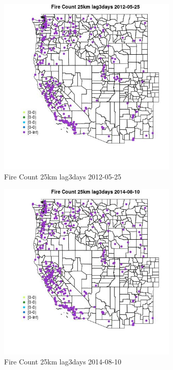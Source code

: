 \begin{figure} 
\centering  
\includegraphics[width=0.77\textwidth]{Code_Outputs/Report_ML_input_PM25_Step4_part_e_de_duplicated_aves_compiled_2019-05-18wNAs_MapObsFire_Count_25km_lag3days2012-05-25.jpg} 
\caption{\label{fig:Report_ML_input_PM25_Step4_part_e_de_duplicated_aves_compiled_2019-05-18wNAsMapObsFire_Count_25km_lag3days2012-05-25}Fire Count 25km lag3days 2012-05-25} 
\end{figure} 
 

\clearpage 

\begin{figure} 
\centering  
\includegraphics[width=0.77\textwidth]{Code_Outputs/Report_ML_input_PM25_Step4_part_e_de_duplicated_aves_compiled_2019-05-18wNAs_MapObsFire_Count_25km_lag3days2014-08-10.jpg} 
\caption{\label{fig:Report_ML_input_PM25_Step4_part_e_de_duplicated_aves_compiled_2019-05-18wNAsMapObsFire_Count_25km_lag3days2014-08-10}Fire Count 25km lag3days 2014-08-10} 
\end{figure} 
 

